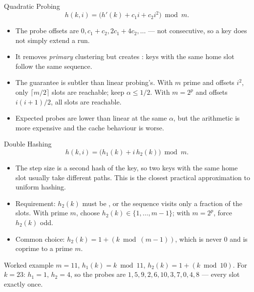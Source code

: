 \documentclass[aspectratio=169]{beamer}
\begin{document}
\begin{frame}{Quadratic Probing}
  \[
    h(k,i) = \bigl(h'(k) + c_1 i + c_2 i^2\bigr) \bmod m.
  \]
  \begin{itemize}
    \item The probe offsets are $0, c_1+c_2, 2c_1+4c_2, \dots$ --- not
      consecutive, so a key does not simply extend a run.
    \item It removes \emph{primary} clustering but creates : keys with the same home slot follow the same sequence.
    \item The guarantee is subtler than linear probing's. With $m$ prime and
      offsets $i^2$, only $\lceil m/2\rceil$ slots are reachable; keep
      $\alpha \le 1/2$. With $m = 2^p$ and offsets $i(i+1)/2$, all slots are
      reachable.
    \item Expected probes are lower than linear at the same $\alpha$, but the
      arithmetic is more expensive and the cache behaviour is worse.
  \end{itemize}
\end{frame}

\begin{frame}{Double Hashing}
  \[
    h(k,i) = \bigl(h_1(k) + i\,h_2(k)\bigr) \bmod m.
  \]
  \begin{itemize}
    \item The step size is a second hash of the key, so two keys with the same
      home slot usually take different paths. This is the closest practical
      approximation to uniform hashing.
    \item Requirement: $h_2(k)$ must be , or the sequence
      visits only a fraction of the slots. With prime $m$, choose
      $h_2(k) \in \{1,\dots,m-1\}$; with $m=2^p$, force $h_2(k)$ odd.
    \item Common choice: $h_2(k) = 1 + (k \bmod (m-1))$, which is never $0$
      and is coprime to a prime $m$.
  \end{itemize}
  \begin{exampleblock}{Worked example}
    $m=11$, $h_1(k)=k\bmod 11$, $h_2(k)=1+(k\bmod 10)$. For $k=23$:
    $h_1=1$, $h_2=4$, so the probes are
    $1, 5, 9, 2, 6, 10, 3, 7, 0, 4, 8$ --- every slot exactly once.
  \end{exampleblock}
\end{frame}
\end{document}

